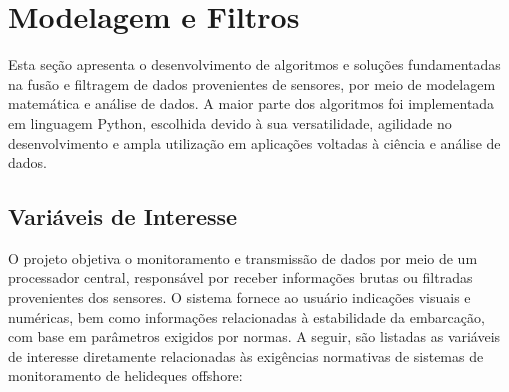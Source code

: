 \documentclass[a4paper, 12pt]{article}
\begin{document}
\newpage
\section{Modelagem e Filtros}
    Esta seção apresenta o desenvolvimento de algoritmos e soluções fundamentadas na fusão e filtragem de dados provenientes de sensores, por meio de modelagem matemática e análise de dados. A maior parte dos algoritmos foi implementada em linguagem Python, escolhida devido à sua versatilidade, agilidade no desenvolvimento e ampla utilização em aplicações voltadas à ciência e análise de dados.

    \subsection{Variáveis de Interesse}
    O projeto objetiva o monitoramento e transmissão de dados por meio de um processador central, responsável por receber informações brutas ou filtradas provenientes dos sensores. O sistema fornece ao usuário indicações visuais e numéricas, bem como informações relacionadas à estabilidade da embarcação, com base em parâmetros exigidos por normas. A seguir, são listadas as variáveis de interesse diretamente relacionadas às exigências normativas de sistemas de monitoramento de helideques offshore:
    
\end{document}
